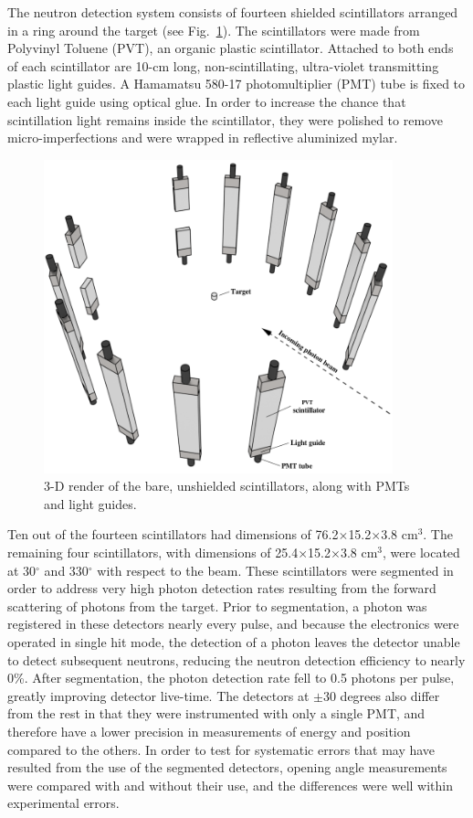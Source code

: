The neutron detection system consists of fourteen shielded scintillators arranged in a ring around the target (see Fig.~\ref{fig:DetGeom}).
The scintillators were made from Polyvinyl Toluene (PVT), an organic plastic scintillator.
Attached to both ends of each scintillator are 10-cm long, non-scintillating, ultra-violet transmitting plastic light guides.
A Hamamatsu 580-17 photomultiplier (PMT) tube is fixed to each light guide using optical glue.
In order to increase the chance that scintillation light remains inside the scintillator, they were polished to remove micro-imperfections and were wrapped in reflective aluminized mylar.

\begin{figure}[]
    \centering
    \includegraphics[width = 0.9\textwidth]{Content/Methods/Detectors.png}
    \caption{3-D render of the bare, unshielded scintillators, along with PMTs and light guides.}
    \label{fig:DetGeom}
\end{figure}

Ten out of the fourteen scintillators had dimensions of 76.2$\times$15.2$\times$3.8 cm$^3$.
The remaining four scintillators, with dimensions of 25.4$\times$15.2$\times$3.8 cm$^3$, were located at 30$^{\circ}$ and 330$^{\circ}$ with respect to the beam.
These scintillators were segmented in order to address very high photon detection rates resulting from the forward scattering of photons from the target.
Prior to segmentation, a photon was registered in these detectors nearly every pulse, and because the electronics were operated in single hit mode, the detection of a photon leaves the detector unable to detect subsequent neutrons, reducing the neutron detection efficiency to nearly 0\%.
After segmentation, the photon detection rate fell to 0.5 photons per pulse, greatly improving detector live-time.
The detectors at $\pm$30 degrees also differ from the rest in that they were instrumented with only a single PMT, and therefore have a lower precision in measurements of energy and position compared to the others.
In order to test for systematic errors that may have resulted from the use of the segmented detectors, opening angle measurements were compared with and without their use, and the differences were well within experimental errors.

